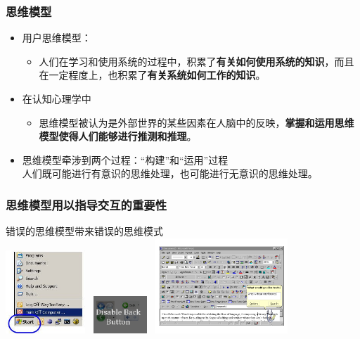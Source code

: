 \documentclass{beamer}
\begin{document}
\begin{frame}
	\frametitle{思维模型}
	\beamertemplatetransparentcovereddynamicmedium
	\transwipe
	\begin{itemize}
		\item 用户思维模型：
		\begin{itemize}
			\item 人们在学习和使用系统的过程中，积累了\textbf{有关如何使用系统的知识}，而且在一定程度上，也积累了\textbf{有关系统如何工作的知识}。
		\end{itemize}\pause
		\item 在认知心理学中
		\begin{itemize}
			\item 思维模型被认为是外部世界的某些因素在人脑中的反映，\textbf{掌握和运用思维模型使得人们能够进行推测和推理}。
		\end{itemize}\pause
		\item 思维模型牵涉到两个过程：“构建”和“运用”过程\\{\tiny 人们既可能进行有意识的思维处理，也可能进行无意识的思维处理。}
	\end{itemize}
\end{frame}

\begin{frame}
	\frametitle{思维模型用以指导交互的重要性}
	\transdissolve
	错误的思维模型带来错误的思维模式\\
	\includegraphics[width=3cm]{images/startbutton.jpg}\pause~
	\includegraphics[width=2cm]{images/disable-back-button-browser.png}\pause~
	\includegraphics[width=5cm]{images/dont-allow-this-to-happen.png}
\end{frame}
\end{document}
